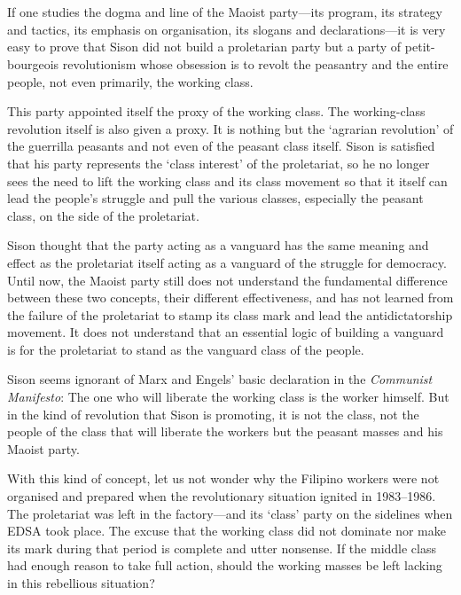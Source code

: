 \section{}
If one studies the dogma and line of the Maoist party---its program, 
its strategy and tactics, 
its emphasis on organisation, 
its slogans and declarations---it 
is very easy to prove that Sison 
did not build a proletarian party 
but a party of petit-bourgeois revolutionism 
whose obsession is to revolt the peasantry and the entire people, 
not even primarily, the working class.

This party appointed itself the proxy of the working class. 
The working-class revolution itself is also given a proxy. 
It is nothing but the `agrarian revolution' 
of the guerrilla peasants 
and not even of the peasant class itself. 
Sison is satisfied that his party represents 
the `class interest' of the proletariat, 
so he no longer sees the need to lift 
the working class and its class movement 
so that it itself can lead the people's struggle 
and pull the various classes, 
especially the peasant class, 
on the side of the proletariat.

Sison thought that the party acting as a vanguard
has the same meaning and effect 
as the proletariat itself acting as 
a vanguard of the struggle for democracy. 
Until now, 
the Maoist party still does not understand 
the fundamental difference between these two concepts, 
their different effectiveness, 
and has not learned from the failure of the proletariat 
to stamp its class mark 
and lead the antidictatorship movement. 
It does not understand that 
an essential logic of building a vanguard 
is for the proletariat 
to stand as the vanguard class of the people.

Sison seems ignorant of Marx and Engels' basic declaration 
in the \textit{Communist Manifesto}:
The one who will liberate the working class is the worker himself.
But in the kind of revolution that Sison is promoting, 
it is not the class, 
not the people of the class 
that will liberate the workers 
but the peasant masses and his Maoist party.

With this kind of concept, 
let us not wonder why the Filipino workers 
were not organised and prepared 
when the revolutionary situation ignited in 1983--1986. 
The proletariat was left in the factory---and 
its `class' party on the sidelines when EDSA took place. 
The excuse that the working class did not dominate nor make its mark 
during that period 
is complete and utter nonsense.
If the middle class had enough reason to take full action, 
should the working masses be left lacking in this rebellious situation?


